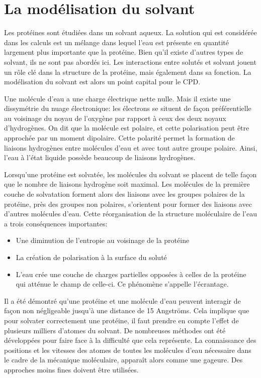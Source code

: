 \section{La modélisation du solvant}
Les protéines sont étudiées dans un solvant aqueux. La solution qui est considérée dans les calculs est un mélange dans lequel l'eau est présente en quantité largement plus importante que la protéine. Bien qu'il existe d'autres types de solvant, ils ne sont pas abordés ici. Les interactions entre solutés et solvant jouent un rôle clé dans la structure de la protéine, mais également dans sa fonction. La modélisation du solvant est alors un point capital pour le CPD.

Une molécule d'eau a une charge électrique nette nulle. Mais il existe une dissymétrie du nuage électronique: les électrons se situent de façon préférentielle au voisinage du noyau de l'oxygène par rapport à ceux des deux noyaux d'hydrogènes. On dit que la molécule est polaire, et cette polarisation peut être approchée par un moment dipolaire. Cette polarité permet la formation de liaisons hydrogènes entre molécules d'eau et avec tout autre groupe polaire. Ainsi, l'eau à l'état liquide possède beaucoup de liaisons hydrogènes.

Lorsqu'une protéine est solvatée, les molécules du solvant se placent de telle façon que le nombre de liaisons hydrogène soit maximal. Les molécules de la première couche de solvatation forment alors des liaisons avec les groupes polaires de la protéine, près des groupes non polaires, s'orientent pour former des liaisons avec d'autres molécules d'eau. Cette réorganisation de la structure moléculaire de l'eau a trois conséquences importantes:

\begin{itemize}
\item Une diminution de l'entropie au voisinage de la protéine  
\item La création de polarisation à la surface du soluté
\item  L'eau crée une couche de charges partielles opposées à celles de la protéine qui atténue le champ de celle-ci. Ce phénomène s'appelle l'écrantage.
\end{itemize}
  
Il a été démontré qu'une protéine et une molécule d'eau peuvent interagir de façon non négligeable jusqu'à une distance de 15 Angströms. Cela implique que pour solvater correctement une protéine, il faut prendre en compte l'effet de plusieurs milliers d'atomes du solvant.
De nombreuses méthodes ont été développées pour faire face à la difficulté que cela représente.
La connaissance des positions et les vitesses des atomes de toutes les molécules d'eau nécessaire dans le cadre de la mécanique moléculaire, apparaît alors comme une gageure. Des approches moins fines doivent être utilisées. 

